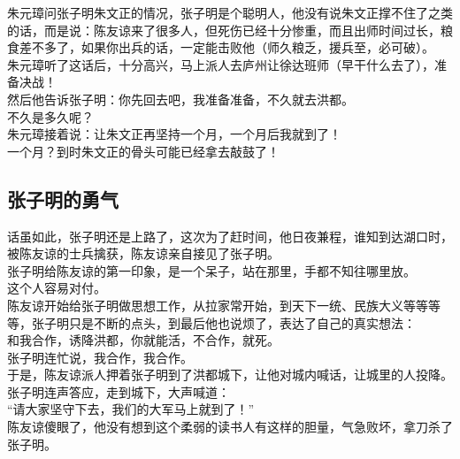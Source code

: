 \begin{multicols}{\theparacolNo}
朱元璋问张子明朱文正的情况，张子明是个聪明人，他没有说朱文正撑不住了之类的话，而是说：陈友谅来了很多人，但死伤已经十分惨重，而且出师时间过长，粮食差不多了，如果你出兵的话，一定能击败他（师久粮乏，援兵至，必可破）。\\

朱元璋听了这话后，十分高兴，马上派人去庐州让徐达班师（早干什么去了），准备决战！\\

然后他告诉张子明：你先回去吧，我准备准备，不久就去洪都。\\

不久是多久呢？\\

朱元璋接着说：让朱文正再坚持一个月，一个月后我就到了！\\

一个月？到时朱文正的骨头可能已经拿去敲鼓了！\\

\subsection{张子明的勇气}
话虽如此，张子明还是上路了，这次为了赶时间，他日夜兼程，谁知到达湖口时，被陈友谅的士兵擒获，陈友谅亲自接见了张子明。\\

张子明给陈友谅的第一印象，是一个呆子，站在那里，手都不知往哪里放。\\

这个人容易对付。\\

陈友谅开始给张子明做思想工作，从拉家常开始，到天下一统、民族大义等等等等，张子明只是不断的点头，到最后他也说烦了，表达了自己的真实想法：\\

和我合作，诱降洪都，你就能活，不合作，就死。\\

张子明连忙说，我合作，我合作。\\

于是，陈友谅派人押着张子明到了洪都城下，让他对城内喊话，让城里的人投降。\\

张子明连声答应，走到城下，大声喊道：\\

“请大家坚守下去，我们的大军马上就到了！”\\

陈友谅傻眼了，他没有想到这个柔弱的读书人有这样的胆量，气急败坏，拿刀杀了张子明。\\


\end{multicols}
